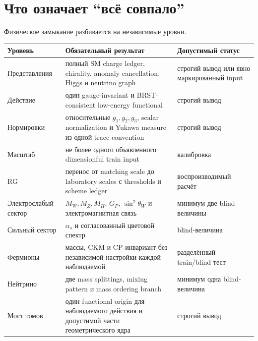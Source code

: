 \section{Что означает ``всё совпало''}

Физическое замыкание разбивается на независимые уровни.

\begin{center}
\small
\begin{longtable}{>{\raggedright\arraybackslash}p{}>{\raggedright\arraybackslash}p{}>{\raggedright\arraybackslash}p{}}
\toprule
Уровень & Обязательный результат & Допустимый статус \\
\midrule
\endhead
Представления & полный SM charge ledger, chirality, anomaly cancellation, Higgs и neutrino graph & строгий вывод или явно маркированный input \\
Действие & один gauge-invariant и BRST-consistent low-energy functional & строгий вывод \\
Нормировки & относительные \(g_1,g_2,g_3\), scalar normalization и Yukawa measure из одной trace convention & строгий вывод \\
Масштаб & не более одного объявленного dimensionful train input & калибровка \\
RG & перенос от matching scale до laboratory scales с thresholds и scheme ledger & воспроизводимый расчёт \\
Электрослабый сектор & \(M_W,M_Z,M_H\), \(G_F\), \(\sin^2\theta_W\) и электромагнитная связь & минимум две blind-величины \\
Сильный сектор & \(\alpha_s\) и согласованный цветовой спектр & blind-величина \\
Фермионы & массы, CKM и CP-инвариант без независимой настройки каждой наблюдаемой & разделённый train/blind тест \\
Нейтрино & две mass splittings, mixing pattern и mass ordering branch & минимум одна blind-величина \\
Мост томов & один functional origin для наблюдаемого действия и допустимой части геометрического ядра & строгий вывод \\
\bottomrule
\end{longtable}
\end{center}

